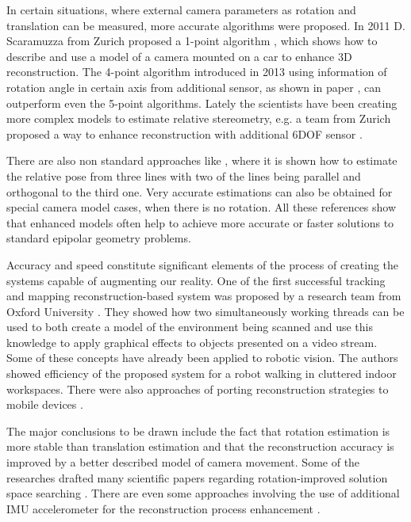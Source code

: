 In certain situations, where external camera parameters as rotation and translation can be measured, more accurate algorithms were proposed.  In 2011 D. Scaramuzza from Zurich proposed a 1-point algorithm \cite{1point}, which shows how to describe and use a model of a camera mounted on a car to enhance 3D reconstruction. The 4-point algorithm introduced in 2013 using information of rotation angle in certain axis from additional sensor, as shown in paper \cite{4point}, can outperform even the 5-point algorithms. Lately the scientists have been creating more complex models to estimate relative stereometry, e.g. a team from Zurich proposed a way to enhance reconstruction with additional 6DOF sensor \cite{robustCameraImu}.

There are also non standard approaches like \cite{lineBasedPose}, where it is shown how to estimate the relative pose from three lines with two of the lines being parallel and orthogonal to the third one. Very accurate estimations can also be obtained for special camera model cases, when there is no rotation\cite{pureTransl}. All these references show that enhanced models often help to achieve more accurate or faster solutions to standard epipolar geometry problems.

Accuracy and speed constitute significant elements of the process of creating the systems capable of augmenting our reality. One of the first successful tracking and mapping reconstruction-based system was proposed by a research team from Oxford University \cite{ptam}. They showed how two simultaneously working threads can be used to both create a model of the environment being scanned and use this knowledge to apply graphical effects to objects presented on a video stream. Some of these concepts have already been applied to robotic vision. The authors showed efficiency of the proposed system for a robot walking in cluttered indoor workspaces\cite{monoSlam}. There were also approaches of porting reconstruction strategies to mobile devices\cite{simultanousRecLocMap} \cite{distributedAR} \cite{combinedMonoSlam} \cite{homographyMobile}.

The major conclusions to be drawn include the fact that rotation estimation is more stable than translation estimation and that the reconstruction accuracy is improved by a better described model of camera movement. Some of the researches drafted many scientific papers regarding rotation-improved solution space searching \cite{rotationSpaceSearch} \cite{Enqvist10stablestructure}. There are even some approaches involving the use of additional IMU accelerometer for the reconstruction process enhancement \cite{robustCameraImu}.


